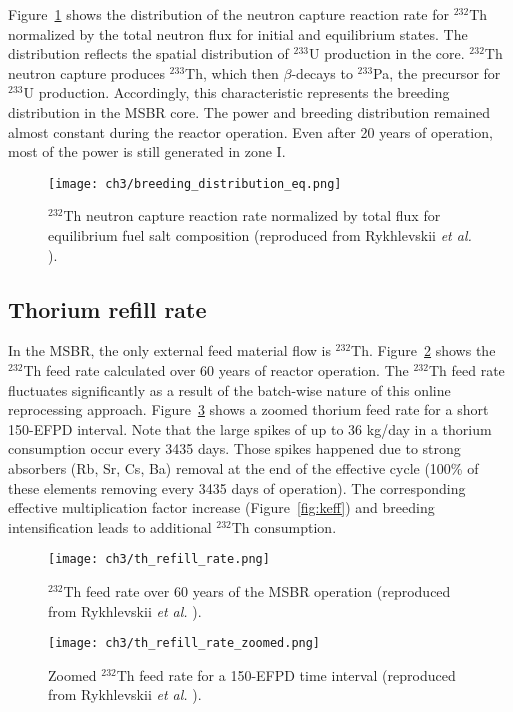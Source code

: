 Figure~\ref{fig:breeding_den} shows the distribution of the neutron capture 
reaction rate for $^{232}$Th normalized by the total neutron flux for initial 
and equilibrium states. The distribution reflects the spatial distribution of 
$^{233}$U production in the core. $^{232}$Th neutron capture produces 
$^{233}$Th, which then $\beta$-decays to $^{233}$Pa, the precursor for 
$^{233}$U production. Accordingly, this characteristic represents the breeding 
distribution in the \gls{MSBR} core. The power and breeding distribution 
remained almost constant during the reactor operation. Even after 20 years of 
operation, most of the power is still generated in zone I.
\begin{figure}[ht!] %
	\centering
	\texttt{[image: ch3/breeding\_distribution\_eq.png]} 
		\vspace{-5mm}
	\caption{$^{232}$Th neutron capture reaction rate normalized by total flux 
		for equilibrium fuel salt composition (reproduced from 
		Rykhlevskii \emph{et al.} \cite{rykhlevskii_modeling_2019}).}
	\label{fig:breeding_den}
\end{figure}
\FloatBarrier

\subsection{Thorium refill rate}
In the \gls{MSBR}, the only external feed material flow  is $^{232}$Th. 
Figure~\ref{fig:th_refill} shows the $^{232}$Th feed rate calculated over 60 
years of reactor operation. The $^{232}$Th feed rate fluctuates significantly 
as a result of the batch-wise nature of this online reprocessing approach. 
Figure~\ref{fig:th_refill_zoomed} shows a zoomed thorium feed rate for a short 
150-EFPD interval. Note that the large spikes of up to 36 kg/day in a thorium 
consumption occur every 3435 days. Those spikes happened due to strong 
absorbers (Rb, Sr, Cs, Ba) removal at the end of the effective cycle (100\% of 
these elements removing every 3435 days of operation). The corresponding 
effective multiplication factor increase (Figure~\ref{fig:keff}) and breeding  
intensification leads to additional $^{232}$Th consumption.  
\begin{figure}[ht!] %
	\texttt{[image: ch3/th\_refill\_rate.png]} 
	\caption{$^{232}$Th feed rate over 60 years of the \gls{MSBR} operation 
	(reproduced from Rykhlevskii \emph{et al.} 
	\cite{rykhlevskii_modeling_2019}).}
	\label{fig:th_refill}
\end{figure}
\begin{figure}[ht!] %
	\texttt{[image: ch3/th\_refill\_rate\_zoomed.png]} 
	\caption{Zoomed $^{232}$Th feed rate for a 150-EFPD time interval 
	(reproduced from Rykhlevskii \emph{et al.} 
	\cite{rykhlevskii_modeling_2019}).}
	\label{fig:th_refill_zoomed}
\end{figure}


